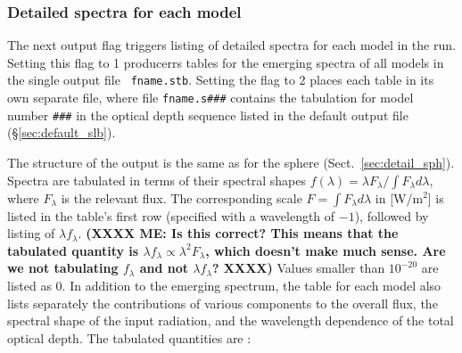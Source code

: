 \documentclass[11pt]{article}
\def\E#1{\hbox{$10^{#1}$}}
\begin{document}
\subsubsection{Detailed spectra for each model }
\label{sec:detail_slb}

The next output flag triggers listing of detailed spectra for each
model in the run.  Setting this flag to 1 producerrs tables for the
emerging spectra of all models in the single output file {\tt
  fname.stb}.  Setting the flag to 2 places each table in its own
separate file, where file {\tt fname.s\#\#\#} contains the tabulation
for model number {\tt \#\#\#} in the optical depth sequence listed in
the default output file (\S\ref{sec:default_slb}).

The structure of the output is the same as for the sphere
(Sect.~\ref{sec:detail_sph}). Spectra are tabulated in terms of their spectral
shapes $f(\lambda) = \lambda F_\lambda/\int\!F_\lambda d\lambda$, where
$F_\lambda$ is the relevant flux. The corresponding  scale $F =
\int\!F_\lambda d\lambda$ in [W/m$^2$] is listed in the table's first row
(specified with a wavelength of $-1$), followed by listing of $\lambda
f_\lambda$. \textbf{(XXXX ME: Is this correct?  This means that the tabulated
quantity is $\lambda f_\lambda \propto \lambda^2F_\lambda$, which doesn't make
much sense. Are we not tabulating $f_\lambda$ and not $\lambda f_\lambda$?
XXXX)} Values smaller than \E{-20} are listed as 0. In addition to the
emerging spectrum, the table for each model also lists separately the
contributions of various components to the overall flux, the spectral shape of
the input radiation, and the wavelength dependence of the total optical depth.
The tabulated quantities are :
%
%
%
\end{document}
